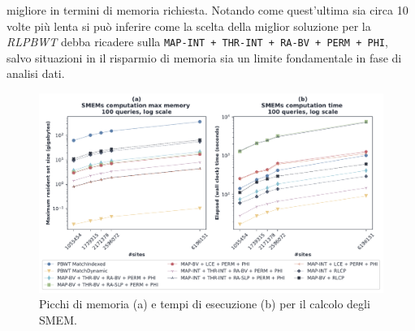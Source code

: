 migliore in termini di memoria richiesta. Notando come quest'ultima sia circa 10
volte più lenta si può inferire come la scelta della miglior soluzione per la
\textit{RLPBWT} debba ricadere sulla \texttt{MAP-INT + THR-INT + RA-BV + PERM +
  PHI}, salvo situazioni in il risparmio di memoria sia un limite fondamentale
in fase di analisi dati. 
\begin{figure}
  \centering
  \includegraphics[width=\linewidth]{img/exe_time_mem_paper}
  \caption{Picchi di memoria (a) e tempi di esecuzione (b) per il calcolo degli
    SMEM.}
  \label{fig:smemtimememchr}
\end{figure}


